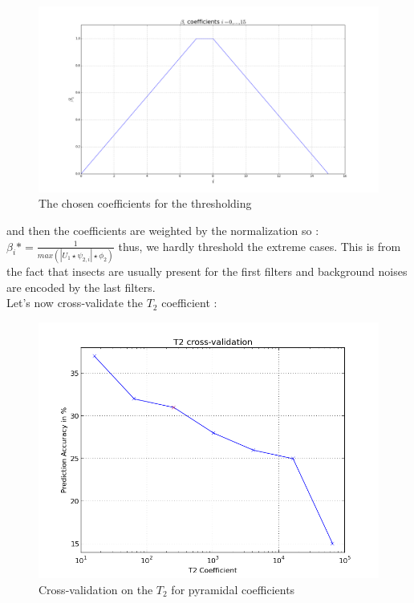 \documentclass[a4paper]{report}
\begin{document}
\begin{figure}[H]
\begin{center}
\includegraphics[scale=0.2]{b_i_coeffs.png}\caption{The chosen coefficients for the thresholding}
\end{center}
\end{figure}
and then the coefficients are weighted by the normalization so : $\beta_i*=\frac{1}{max(|U_1 \star \psi_{2,i}|\star \phi_2)}$
thus, we hardly threshold the extreme cases. This is from the fact that insects are usually present for the first filters and background noises are encoded by the last filters.
\\
Let's now cross-validate the $T_2$ coefficient :
\begin{figure}[H]
\begin{center}
\includegraphics[scale=0.5]{cross_T2_weighted_agregated.png}\caption{Cross-validation on the $T_2$ for pyramidal coefficients}
\end{center}
\end{figure}
\end{document}
